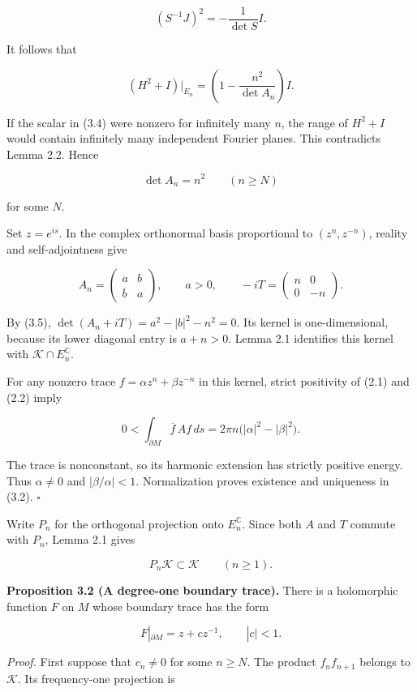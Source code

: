 \documentclass[11pt]{article}
\begin{document}
\[
(S^{-1}J)^2=-\frac{1}{\det S}I.
\tag{3.3}
\]

It follows that

\[
(H^2+I)|_{E_n}
=\left(1-\frac{n^2}{\det A_n}\right)I.
\tag{3.4}
\]

If the scalar in (3.4) were nonzero for infinitely many \(n\), the range
of \(H^2+I\) would contain infinitely many independent Fourier planes.
This contradicts Lemma 2.2. Hence

\[
\det A_n=n^2\qquad(n\geq N)
\tag{3.5}
\]

for some \(N\).

Set \(z=e^{is}\). In the complex orthonormal basis proportional to
\((z^n,z^{-n})\), reality and self-adjointness give

\[
A_n=\begin{pmatrix}a&b\\\overline b&a\end{pmatrix},\qquad a>0,
\qquad -iT=\begin{pmatrix}n&0\\0&-n\end{pmatrix}.
\tag{3.6}
\]

By (3.5), \(\det(A_n+iT)=a^2-|b|^2-n^2=0\). Its kernel is
one-dimensional, because its lower diagonal entry is \(a+n>0\). Lemma
2.1 identifies this kernel with \(\mathcal K\cap E_n^{\mathbb C}\).

For any nonzero trace \(f=\alpha z^n+\beta z^{-n}\) in this kernel,
strict positivity of (2.1) and (2.2) imply

\[
0<\int_{\partial M}\overline f\,Af\,ds
=2\pi n\bigl(|\alpha|^2-|\beta|^2\bigr).
\tag{3.7}
\]

The trace is nonconstant, so its harmonic extension has strictly
positive energy. Thus \(\alpha\ne0\) and \(|\beta/\alpha|<1\).
Normalization proves existence and uniqueness in (3.2). \(\square\)

Write \(P_n\) for the orthogonal projection onto \(E_n^{\mathbb C}\).
Since both \(A\) and \(T\) commute with \(P_n\), Lemma 2.1 gives

\[
P_n\mathcal K\subset\mathcal K\qquad(n\geq1).
\tag{3.8}
\]

\textbf{Proposition 3.2 (A degree-one boundary trace).} There is a
holomorphic function \(F\) on \(M\) whose boundary trace has the form

\[
F|_{\partial M}=z+c z^{-1},\qquad |c|<1.
\tag{3.9}
\]

\emph{Proof.} First suppose that \(c_n\ne0\) for some \(n\geq N\). The
product \(f_nf_{n+1}\) belongs to \(\mathcal K\). Its frequency-one
projection is
\end{document}
